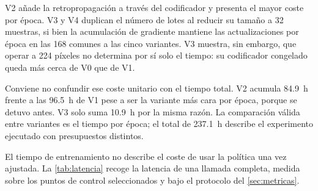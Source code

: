 V2 a\~nade la retropropagaci\'on a trav\'es del codificador y presenta el mayor coste por
\'epoca. V3 y V4 duplican el n\'umero de lotes al reducir su tama\~no a \num{32} muestras,
si bien la acumulaci\'on de gradiente mantiene las actualizaciones por \'epoca en las
\num{168} comunes a las cinco variantes. V3 muestra, sin embargo, que operar a \num{224}
p\'ixeles no determina por s\'i solo el tiempo: su codificador congelado queda m\'as cerca
de V0 que de V1.

Conviene no confundir ese coste unitario con el tiempo total. V2 acumula \SI{84.9}{\hour}
frente a las \SI{96.5}{\hour} de V1 pese a ser la variante m\'as cara por \'epoca, porque
se detuvo antes. V3 solo suma \SI{10.9}{\hour} por la misma raz\'on. La comparaci\'on v\'alida
entre variantes es el tiempo por \'epoca; el total de \SI{237.1}{\hour} describe el
experimento ejecutado con presupuestos distintos.


El tiempo de entrenamiento no describe el coste de usar la pol\'itica una vez ajustada. La
\cref{tab:latencia} recoge la latencia de una llamada completa, medida sobre los puntos de
control seleccionados y bajo el protocolo del \cref{sec:metricas}.

